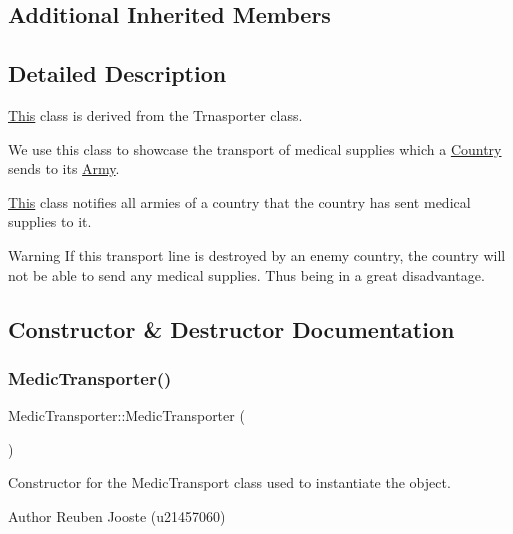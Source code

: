 \subsection*{Additional Inherited Members}


\subsection{Detailed Description}
\mbox{\hyperlink{class_this}{This}} class is derived from the Trnasporter class.
\begin{DoxyItemize}
\item We use this class to showcase the transport of medical supplies which a \mbox{\hyperlink{class_country}{Country}} sends to its \mbox{\hyperlink{class_army}{Army}}.
\item \mbox{\hyperlink{class_this}{This}} class notifies all armies of a country that the country has sent medical supplies to it. \begin{DoxyWarning}{Warning}
If this transport line is destroyed by an enemy country, the country will not be able to send any medical supplies. Thus being in a great disadvantage. 
\end{DoxyWarning}

\end{DoxyItemize}

\subsection{Constructor \& Destructor Documentation}
\mbox{\label{class_medic_transporter_a3299a61e61e6d74ff9db3cf66048d710}} 
\subsubsection{\texorpdfstring{MedicTransporter()}{MedicTransporter()}}
{\footnotesize\ttfamily Medic\+Transporter\+::\+Medic\+Transporter (\begin{DoxyParamCaption}{ }\end{DoxyParamCaption})}



Constructor for the Medic\+Transport class used to instantiate the object. 

\begin{DoxyAuthor}{Author}
Reuben Jooste (u21457060) 
\end{DoxyAuthor}
\mbox{\label{class_medic_transporter_abf9f79be8b43d8bd0a67ad73ce0885f0}} 
